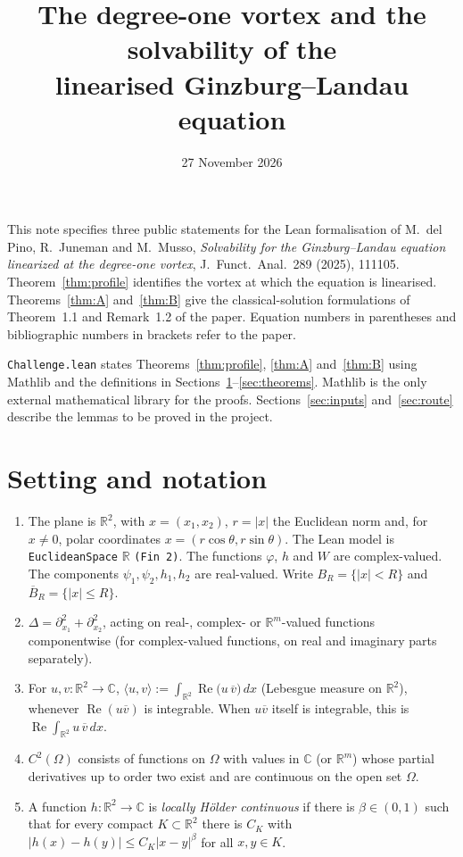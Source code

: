 \documentclass[11pt]{amsart}
\title[Informal statements for the GLSolvability formalisation]{The degree-one vortex and the solvability of the\\
linearised Ginzburg--Landau equation}
\date{27 November 2026}
\theoremstyle{definition}
\newcommand{\C}{\mathbb{C}}
\newcommand{\R}{\mathbb{R}}
\renewcommand{\Re}{\operatorname{Re}}
\newcommand{\ip}[2]{\langle #1,#2\rangle}
\begin{document}
\maketitle

This note specifies three public statements for the Lean formalisation of
M.~del Pino, R.~Juneman and M.~Musso, \emph{Solvability for the Ginzburg--Landau
equation linearized at the degree-one vortex}, J.~Funct.\ Anal.\ 289 (2025), 111105.
Theorem~\ref{thm:profile} identifies the vortex at which the equation is linearised.
Theorems~\ref{thm:A} and~\ref{thm:B} give the classical-solution formulations of
Theorem~1.1 and Remark~1.2 of the paper. Equation numbers in parentheses and
bibliographic numbers in brackets refer to the paper.

\texttt{Challenge.lean} states Theorems~\ref{thm:profile}, \ref{thm:A}
and~\ref{thm:B} using Mathlib and the definitions in
Sections~\ref{sec:setting}--\ref{sec:theorems}. Mathlib is the only external
mathematical library for the proofs. Sections~\ref{sec:inputs}
and~\ref{sec:route} describe the lemmas to be proved in the project.

\section{Setting and notation}\label{sec:setting}

\begin{enumerate}[label=(\roman*)]
  \item The plane is $\R^2$, with $x = (x_1, x_2)$, $r = |x|$ the Euclidean norm and, for
        $x \neq 0$, polar coordinates $x = (r\cos\theta, r\sin\theta)$.
        The Lean model is \texttt{EuclideanSpace} $\R$ \texttt{(Fin 2)}.
        The functions $\varphi$, $h$ and $W$ are complex-valued.
        The components $\psi_1,\psi_2,h_1,h_2$ are real-valued.
        Write $B_R=\{|x|<R\}$ and $\overline{B}_R=\{|x|\le R\}$.
  \item $\Delta = \partial_{x_1}^2 + \partial_{x_2}^2$, acting on real-, complex- or $\R^m$-valued
        functions componentwise (for complex-valued functions, on real and imaginary parts
        separately).
  \item For $u, v \colon \R^2 \to \C$, $\ip{u}{v} := \int_{\R^2} \Re\bigl(u\,\overline{v}\bigr)\,dx$
        (Lebesgue measure on $\R^2$), whenever $\Re(u\overline v)$ is integrable. When
        $u\overline v$ itself is integrable, this is $\Re \int_{\R^2} u\,\overline{v}\,dx$.
  \item $C^2(\Omega)$ consists of functions on $\Omega$ with values in $\C$
        (or $\R^m$) whose partial derivatives up to
        order two exist and are continuous on the open set $\Omega$.
  \item A function $h \colon \R^2 \to \C$ is \emph{locally H\"older continuous} if there is
        $\beta \in (0,1)$ such that for every compact $K \subset \R^2$ there is $C_K$ with
        $|h(x) - h(y)| \le C_K |x-y|^{\beta}$ for all $x, y \in K$.
\end{enumerate}
\end{document}
